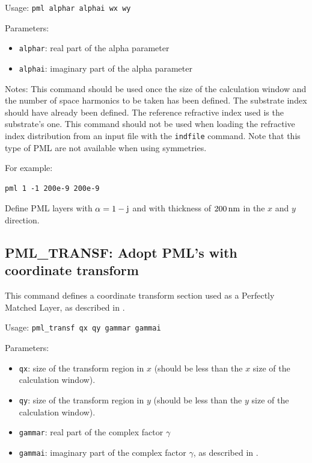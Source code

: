 Usage: \lstinline!pml alphar alphai wx wy!
    
Parameters:
\begin{itemize}
\item \lstinline!alphar!: real part of the alpha parameter
\item \lstinline!alphai!: imaginary part of the alpha parameter
\end{itemize}

Notes:
    This command should be used once the size of the calculation window and 
    the number of space harmonics to be taken has been defined.
    The substrate index should have already been defined.
    The reference refractive index used is the substrate's one. This command
    should not be used when loading the refractive index distribution from an
    input file with the \lstinline!indfile! command.
    Note that this type of PML are not available when using symmetries.

For example:
\begin{lstlisting}
pml 1 -1 200e-9 200e-9
\end{lstlisting}
Define PML layers with $\alpha=1-\mathrm{j}$ and with thickness of $200\,\mathrm{nm}$ in the $x$ and $y$ direction.

\subsection{PML\_TRANSF: Adopt PML's with coordinate transform}
\label{subsec_pml_transf}
This command defines a coordinate transform section used as a Perfectly 
Matched Layer, as described in \cite{hugonin2005fourier}.

Usage: \lstinline!pml_transf qx qy gammar gammai!
    
Parameters:
\begin{itemize}
\item \lstinline!qx!: size of the transform region in $x$ (should be less than the $x$ size of the calculation window).
\item \lstinline!qy!: size of the transform region in $y$ (should be less than the $y$ size of the calculation window).
\item \lstinline!gammar!: real part of the complex factor $\gamma$
\item \lstinline!gammai!: imaginary part of the complex factor $\gamma$, as described in \cite{hugonin2005pml}.
\end{itemize}
